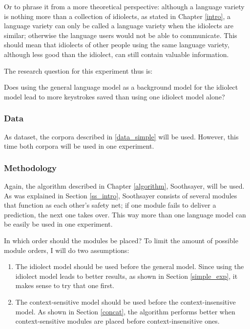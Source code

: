 \documentclass[11pt]{article}
\begin{document}
Or to phrase it from a more theoretical perspective: although a language variety is nothing more than a collection of idiolects, as stated in Chapter \ref{intro}, a language variety can only be called a language variety when the idiolects are similar; otherwise the language users would not be able to communicate. This should mean that idiolects of other people using the same language variety, although less good than the idiolect, can still contain valuable information.

The research question for this experiment thus is:

\begin{examples}

\item Does using the general language model as a background model for the idiolect model lead to more keystrokes saved than using one idiolect model alone?

\end{examples}

\subsubsection{Data}
As dataset, the corpora described in \ref{data_simple} will be used. However, this time  both corpora will be used in one experiment.

\subsubsection{Methodology}
Again, the algorithm described in Chapter \ref{algorithm}, Soothsayer, will be used. As was explained in Section \ref{ss_intro}, Soothsayer consists of several modules that function as each other's safety net; if one module fails to deliver a prediction, the next one takes over. This way more than one language model can be easily be used in one experiment.

In which order should the modules be placed? To limit the amount of possible module orders, I will do two assumptions:

\begin{enumerate}

\item The idiolect model should be used before the general model. Since using the idiolect model leads to better results, as shown in Section \ref{simple_exp}, it makes sense to try that one first.
\item The context-sensitive model should be used before the context-insensitive model. As shown in Section \ref{concat}, the algorithm performs better when context-sensitive modules are placed before context-insensitive ones.

\end{enumerate}
\end{document}
